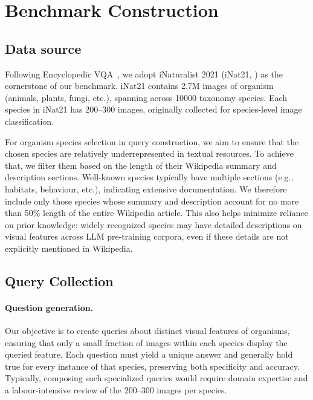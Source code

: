 \section{Benchmark Construction}
\label{sec:const}

\subsection{Data source}
Following Encyclopedic VQA~\cite{Mensink_2023_ICCV}, we adopt iNaturalist 2021 (iNat21, \citealp{Van_Horn_2021_CVPR}) as the cornerstone of our benchmark. iNat21 contains 2.7M images of organism (animals, plants, fungi, etc.), spanning across 10000 taxonomy species. Each species in iNat21 has 200–300 images, originally collected for species-level image classification. 

For organism species selection in query construction, we aim to ensure that the chosen species are relatively underrepresented in textual resources. To achieve that, we filter them based on the length of their Wikipedia summary and description sections. Well-known species typically have multiple sections (e.g., habitats, behaviour, etc.), indicating extensive documentation. We therefore include only those species whose summary and description account for no more than 50\% length of the entire Wikipedia article. This also helps minimize reliance on prior knowledge: widely recognized species may have detailed descriptions on visual features across LLM pre-training corpora, even if these details are not explicitly mentioned in Wikipedia.

\subsection{Query Collection}
\paragraph{Question generation.}
Our objective is to create queries about distinct visual features of organisms, ensuring that only a small fraction of images within each species display the queried feature. Each question must yield a unique answer and generally hold true for every instance of that species, preserving both specificity and accuracy. Typically, composing such specialized queries would require domain expertise and a labour-intensive review of the 200–300 images per species.

